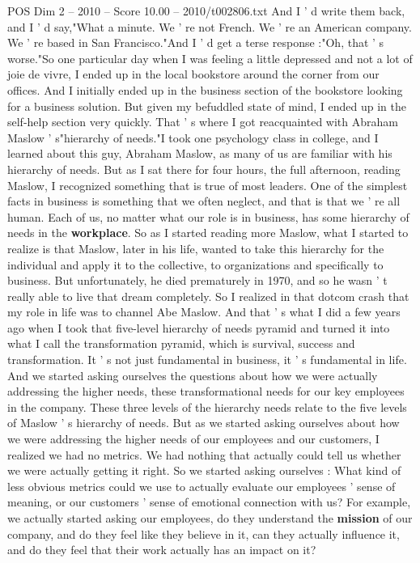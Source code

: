 \begin{textsample}{POS Dim 2 – 2010 – Score 10.00 – 2010/t002806.txt}
And I ' d write them back, and I ' d say,"What a minute.
We ' re not French.
We ' re an American company.
We ' re based in San Francisco."And I ' d get a terse response :"Oh, that ' s worse."So one particular day when I was feeling a little depressed and not a lot of joie de vivre, I ended up in the local bookstore around the corner from our offices.
And I initially ended up in the business section of the bookstore looking for a business solution.
But given my befuddled state of mind, I ended up in the self-help section very quickly.
That ' s where I got reacquainted with Abraham Maslow ' s"hierarchy of needs."I took one psychology class in college, and I learned about this guy, Abraham Maslow, as many of us are familiar with his hierarchy of needs.
But as I sat there for four hours, the full afternoon, reading Maslow, I recognized something that is true of most leaders.
One of the simplest facts in business is something that we often neglect, and that is that we ' re all human.
Each of us, no matter what our role is in business, has some hierarchy of needs in the \textbf{workplace}.
So as I started reading more Maslow, what I started to realize is that Maslow, later in his life, wanted to take this hierarchy for the individual and apply it to the collective, to organizations and specifically to business.
But unfortunately, he died prematurely in 1970, and so he wasn ' t really able to live that dream completely.
So I realized in that dotcom crash that my role in life was to channel Abe Maslow.
And that ' s what I did a few years ago when I took that five-level hierarchy of needs pyramid and turned it into what I call the transformation pyramid, which is survival, success and transformation.
It ' s not just fundamental in business, it ' s fundamental in life.
And we started asking ourselves the questions about how we were actually addressing the higher needs, these transformational needs for our key employees in the company.
These three levels of the hierarchy needs relate to the five levels of Maslow ' s hierarchy of needs.
But as we started asking ourselves about how we were addressing the higher needs of our employees and our customers, I realized we had no metrics.
We had nothing that actually could tell us whether we were actually getting it right.
So we started asking ourselves : What kind of less obvious metrics could we use to actually evaluate our employees ' sense of meaning, or our customers ' sense of emotional connection with us?
For example, we actually started asking our employees, do they understand the \textbf{mission} of our company, and do they feel like they believe in it, can they actually influence it, and do they feel that their work actually has an impact on it?

\end{textsample}

